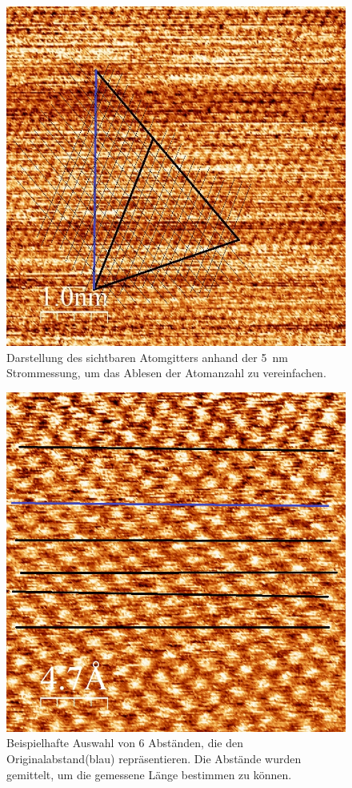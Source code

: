 \documentclass[12pt,a4paper]{article}
\begin{document}
\begin{figure}
\centering
\includegraphics[scale=0.5]{Bilder/Atome/strom5_v_gitter.jpg}
\caption{Darstellung des sichtbaren Atomgitters anhand der \SI{5}{nm} Strommessung, um das Ablesen der Atomanzahl zu vereinfachen.}
\label{fig:strom5_symmetire}
\end{figure}

\begin{figure}
\centering
\includegraphics[scale=0.5]{Bilder/Atome/hoch2_abstand.jpg}
\caption{Beispielhafte Auswahl von 6 Abständen, die den Originalabstand(blau) repräsentieren. Die Abstände wurden gemittelt, um die gemessene Länge bestimmen zu können.}
\label{fig:strom2_abstand}
\end{figure}
\end{document}

